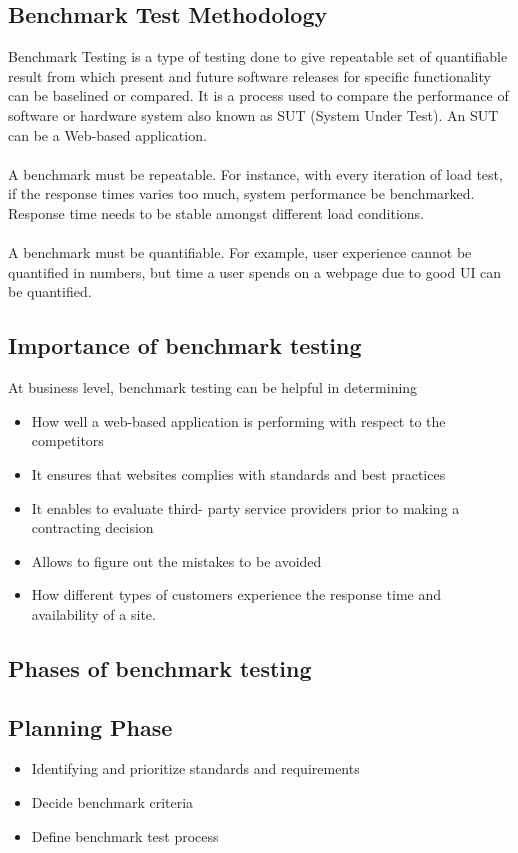 \documentclass[../thesis.tex]{subfiles}
\begin{document}
	\subsection{Benchmark Test Methodology}
	Benchmark Testing is a type of testing done to give repeatable set of quantifiable result from which present and future software releases for specific functionality can be baselined or compared. It is a process used to compare the performance of software or hardware system also known as SUT (System Under Test). An SUT can be a Web-based application.
	\paragraph{}
	A benchmark must be repeatable. For instance, with every iteration of load test, if the response times varies too much, system performance be benchmarked. Response time needs to be stable amongst different load conditions.
	\paragraph{}
	A benchmark must be quantifiable. For example, user experience cannot be quantified in numbers, but time a user spends on a webpage due to good UI can be quantified.
	
	\subsection*{Importance of benchmark testing}
	At business level, benchmark testing can be helpful in determining

	\begin{itemize}
		\item How well a web-based application is performing with respect to the competitors
		\item It ensures that websites complies with standards and best practices
		\item It enables to evaluate third- party service providers prior to making a contracting decision
		\item Allows to figure out the mistakes to be avoided
		\item How different types of customers experience the response time and availability of a site.
	\end{itemize}
	\subsection{Phases of benchmark testing}
	\subsection*{Planning Phase}
	\begin{itemize}
		\item Identifying and prioritize standards and requirements
		\item Decide benchmark criteria
		\item Define benchmark test process
	\end{itemize}
\end{document}
